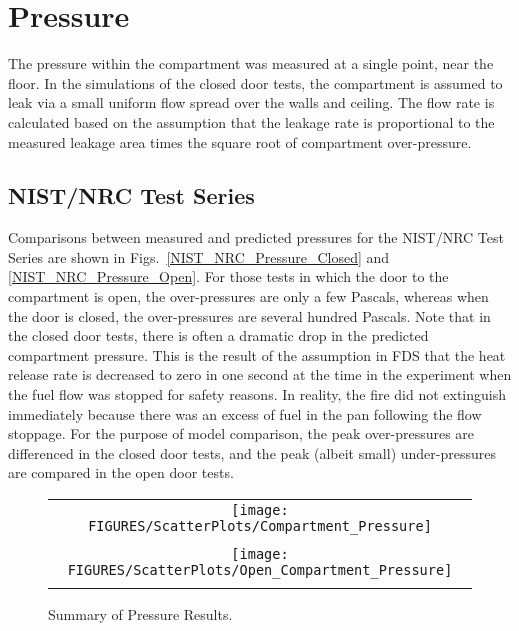 \chapter{Pressure}

The pressure within the compartment was measured at a single point, near the floor.
In the simulations of the closed door tests, the compartment is assumed to leak via a small uniform flow spread
over the walls and ceiling.  The flow rate is calculated based on the assumption that the leakage rate is proportional
to the measured leakage area times the square root of compartment over-pressure.


\section{NIST/NRC Test Series}

Comparisons between measured and predicted pressures for the NIST/NRC Test Series are shown
in Figs.~\ref{NIST_NRC_Pressure_Closed} and \ref{NIST_NRC_Pressure_Open}.
For those tests in which the door to the compartment is
open, the over-pressures are only a few Pascals, whereas when the door is closed, the over-pressures are several hundred Pascals.
Note that in the closed door tests, there is often a dramatic drop in the predicted compartment pressure.
This is the result of the assumption in FDS that the heat release rate is decreased to zero in one second at the time
in the experiment when the fuel flow was stopped for safety reasons.  In reality, the fire did not extinguish
immediately because there was an excess of fuel in the pan following the flow stoppage.
For the purpose of model comparison, the peak over-pressures are differenced in the closed door tests,
and the peak (albeit small) under-pressures are compared in the open door tests.



\begin{figure}[p]
\begin{center}
\begin{tabular}{c}
\texttt{[image: FIGURES/ScatterPlots/Compartment\_Pressure]} \\
\vspace{0.25in} \\
\texttt{[image: FIGURES/ScatterPlots/Open\_Compartment\_Pressure]} \\
\vspace{0.25in} 
\end{tabular}
\caption{Summary of Pressure Results.}
\end{center}
\end{figure}

\clearpage
